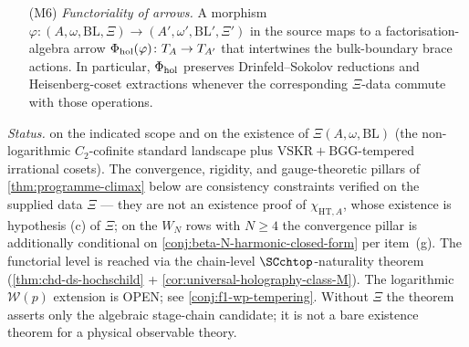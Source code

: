 \begin{theorem}
\begin{enumerate}
 $\SCchtop$-action; topologisation by $\omega$ at non-critical
 level promotes $\SCchtop$ to $E_{3}$-topological. The action is
	 natural in \((A,\omega,\mathrm{BL},\Xi)\).
	\item[(M6)] \emph{Functoriality of arrows.} A morphism
	 \(\varphi\colon (A,\omega,\mathrm{BL},\Xi) \to
	 (A',\omega',\mathrm{BL}',\Xi')\) in the source maps to a
	 factorisation-algebra arrow
	 $\Phi_{\mathrm{hol}}(\varphi)\colon T_{A} \to T_{A'}$ that intertwines the
	 bulk-boundary brace actions. In particular, \(\Phi_{\mathrm{hol}}\) preserves
	 Drinfeld--Sokolov reductions and Heisenberg-coset extractions
	 whenever the corresponding \(\Xi\)-data commute with those
	 operations.
\end{enumerate}
	\emph{Status.} \ClaimStatusConditional on the indicated scope and
	on the existence of \(\Xi(A,\omega,\mathrm{BL})\) (the
	non-logarithmic $C_{2}$-cofinite standard landscape plus
	$\mathrm{VSKR} + \mathrm{BGG}$-tempered irrational cosets). The
	convergence, rigidity, and gauge-theoretic pillars of
\cref{thm:programme-climax} below are consistency constraints
verified on the supplied data \(\Xi\) --- they are not an existence
proof of \(\chi_{\mathrm{HT},A}\), whose existence is hypothesis
(c) of \(\Xi\); on the $W_{N}$ rows with $N \ge 4$ the convergence
pillar is additionally conditional on
\cref{conj:beta-N-harmonic-closed-form} per item~(g). The functorial
level is reached via the chain-level $\SCchtop$-naturality theorem
	(\cref{thm:chd-ds-hochschild} +
	\cref{cor:universal-holography-class-M}). The logarithmic
	$\mathcal{W}(p)$ extension is OPEN; see
	\cref{conj:f1-wp-tempering}. Without \(\Xi\) the theorem asserts
	only the algebraic stage-chain candidate; it is not a bare existence
	theorem for a physical observable theory.
\end{theorem}


